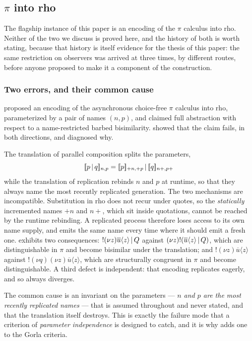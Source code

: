 \documentclass{article}
\begin{document}
\subsection{$\pi$ into rho}
\label{sec:pirho}

The flagship instance of this paper is an encoding of the $\pi$ calculus into rho. Neither of the two we discuss is proved here, and the history of both is worth stating, because that history is itself evidence for the thesis of this paper: the same restriction on observers was arrived at three times, by different routes, before anyone proposed to make it a component of the construction.

\subsubsection*{Two errors, and their common cause}

\citet{rho} proposed an encoding of the asynchronous choice-free $\pi$ calculus into rho, parameterized by a pair of names $(n,p)$, and claimed full abstraction with respect to a name-restricted barbed bisimilarity. \citet{lybech} showed that the claim fails, in both directions, and diagnosed why.

The translation of parallel composition splits the parameters,
\[[\![p\,|\, q]\!]_{n,p} = [\![p]\!]_{+n,+p}\,|\, [\![q]\!]_{n+,p+}\]
while the translation of replication rebinds $n$ and $p$ at runtime, so that they always name the most recently replicated generation. The two mechanisms are incompatible. Substitution in rho does not recur under quotes, so the \emph{statically} incremented names $+n$ and $n+$, which sit inside quotations, cannot be reached by the runtime rebinding. A replicated process therefore loses access to its own name supply, and emits the same name every time where it should emit a fresh one. \citet{lybech} exhibits two consequences: $!(\nu z)\overline{u}\langle z\rangle \,|\, Q$ against $(\nu z)!(\overline{u}\langle z\rangle\,|\, Q)$, which are distinguishable in $\pi$ and become bisimilar under the translation; and $!(\nu z)\overline{u}\langle z\rangle$ against $!(\nu q)(\nu z)\overline{u}\langle z\rangle$, which are structurally congruent in $\pi$ and become distinguishable. A third defect is independent: that encoding replicates eagerly, and so always diverges.

The common cause is an invariant on the parameters --- \emph{$n$ and $p$ are the most recently replicated names} --- that is assumed throughout and never stated, and that the translation itself destroys. This is exactly the failure mode that a criterion of \emph{parameter independence} is designed to catch, and it is why \citet{lybech} adds one to the Gorla criteria.
\end{document}
